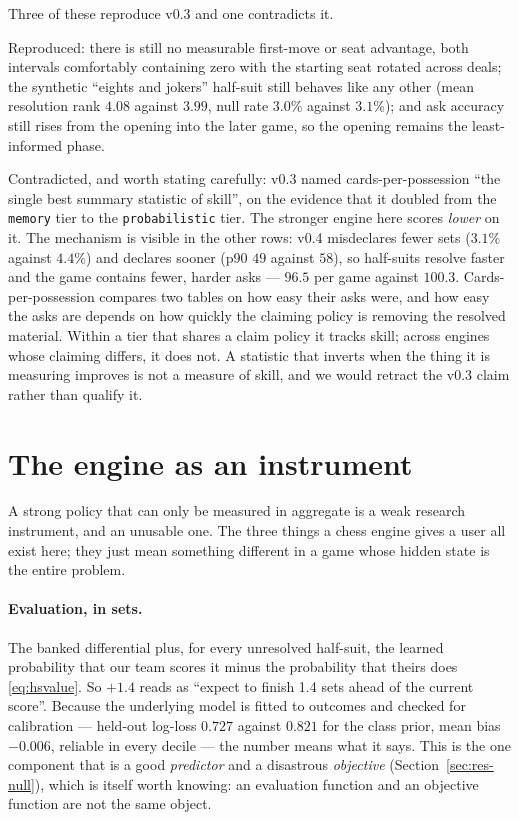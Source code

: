 \documentclass[11pt,a4paper]{article}
\begin{document}
Three of these reproduce v0.3 and one contradicts it.

Reproduced: there is still no measurable first-move or seat advantage, both
intervals comfortably containing zero with the starting seat rotated across
deals; the synthetic ``eights and jokers'' half-suit still behaves like any
other (mean resolution rank $4.08$ against $3.99$, null rate $3.0\%$ against
$3.1\%$); and ask accuracy still rises from the opening into the later game,
so the opening remains the least-informed phase.

Contradicted, and worth stating carefully: v0.3 named cards-per-possession
``the single best summary statistic of skill'', on the evidence that it doubled
from the \texttt{memory} tier to the \texttt{probabilistic} tier. The stronger
engine here scores \emph{lower} on it. The mechanism is visible in the other
rows: v0.4 misdeclares fewer sets ($3.1\%$ against $4.4\%$) and declares sooner (p90 $49$
against $58$), so half-suits resolve faster and the game contains fewer, harder
asks --- $96.5$ per game against $100.3$. Cards-per-possession compares two
tables on how easy their asks were, and how easy the asks are depends on how
quickly the claiming policy is removing the resolved material. Within a tier
that shares a claim policy it tracks skill; across engines whose claiming
differs, it does not. A statistic that inverts when the thing it is measuring
improves is not a measure of skill, and we would retract the v0.3 claim rather
than qualify it.

\section{The engine as an instrument}
\label{sec:engine}

A strong policy that can only be measured in aggregate is a weak research
instrument, and an unusable one. The three things a chess engine gives a user
all exist here; they just mean something different in a game whose hidden state
is the entire problem.

\paragraph{Evaluation, in sets.} The banked differential plus, for every
unresolved half-suit, the learned probability that our team scores it minus the
probability that theirs does \eqref{eq:hsvalue}. So $+1.4$ reads as ``expect to
finish 1.4 sets ahead of the current score''. Because the underlying model is
fitted to outcomes and checked for calibration --- held-out log-loss $0.727$
against $0.821$ for the class prior, mean bias $-0.006$, reliable in every
decile --- the number means what it says. This is the one component that is a
good \emph{predictor} and a disastrous \emph{objective}
(Section~\ref{sec:res-null}), which is itself worth knowing: an evaluation
function and an objective function are not the same object.
\end{document}
